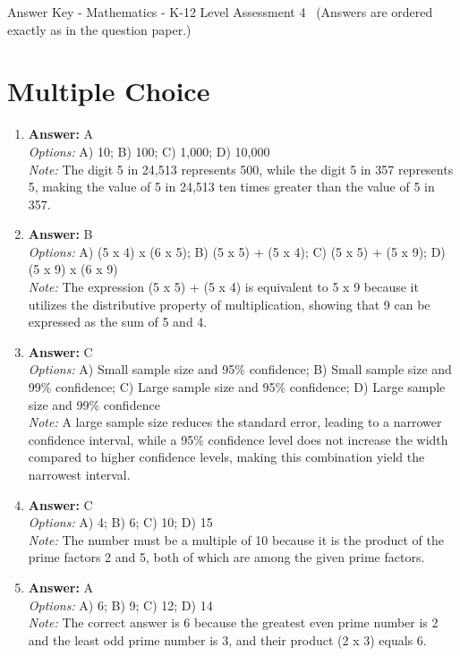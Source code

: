 \documentclass[12pt]{article}
\begin{document}
\begin{center}
Answer Key - Mathematics - K-12 Level Assessment 4 \
\small (Answers are ordered exactly as in the question paper.)
\end{center}

\section*{Multiple Choice}
\begin{enumerate}[label=\arabic*.]
\item \textbf{Answer:} A
\\ \textit{Options:} A) 10; B) 100; C) 1,000; D) 10,000
\\ \textit{Note:} The digit 5 in 24,513 represents 500, while the digit 5 in 357 represents 5, making the value of 5 in 24,513 ten times greater than the value of 5 in 357.
\item \textbf{Answer:} B
\\ \textit{Options:} A) (5 x 4) x (6 x 5); B) (5 x 5) + (5 x 4); C) (5 x 5) + (5 x 9); D) (5 x 9) x (6 x 9)
\\ \textit{Note:} The expression (5 x 5) + (5 x 4) is equivalent to 5 x 9 because it utilizes the distributive property of multiplication, showing that 9 can be expressed as the sum of 5 and 4.
\item \textbf{Answer:} C
\\ \textit{Options:} A) Small sample size and 95\% confidence; B) Small sample size and 99\% confidence; C) Large sample size and 95\% confidence; D) Large sample size and 99\% confidence
\\ \textit{Note:} A large sample size reduces the standard error, leading to a narrower confidence interval, while a 95\% confidence level does not increase the width compared to higher confidence levels, making this combination yield the narrowest interval.
\item \textbf{Answer:} C
\\ \textit{Options:} A) 4; B) 6; C) 10; D) 15
\\ \textit{Note:} The number must be a multiple of 10 because it is the product of the prime factors 2 and 5, both of which are among the given prime factors.
\item \textbf{Answer:} A
\\ \textit{Options:} A) 6; B) 9; C) 12; D) 14
\\ \textit{Note:} The correct answer is 6 because the greatest even prime number is 2 and the least odd prime number is 3, and their product (2 x 3) equals 6.
\end{enumerate}
\end{document}
